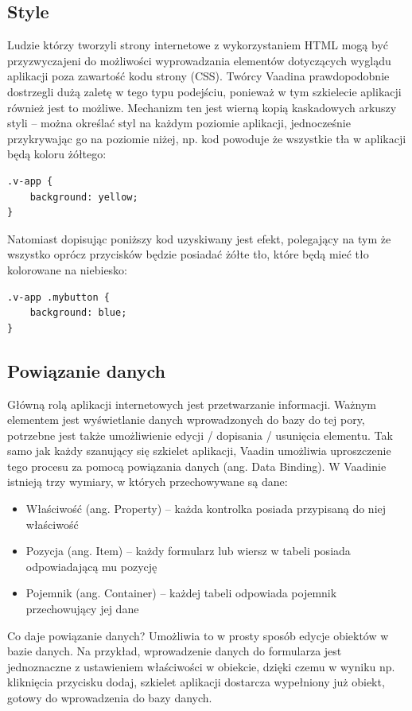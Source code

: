 \subsection{Style}
Ludzie którzy tworzyli strony internetowe z wykorzystaniem HTML mogą być przyzwyczajeni do możliwości wyprowadzania elementów dotyczących wyglądu aplikacji poza zawartość kodu strony (CSS). Twórcy Vaadina prawdopodobnie dostrzegli dużą zaletę w tego typu podejściu, ponieważ w tym szkielecie aplikacji również jest to możliwe. Mechanizm ten jest wierną kopią kaskadowych arkuszy styli – można określać styl na każdym poziomie aplikacji, jednocześnie przykrywając go na poziomie niżej, np. kod powoduje że wszystkie tła w aplikacji będą koloru żółtego:
\newpage
\begin{lstlisting}
.v-app {
	background: yellow;
}
\end{lstlisting}
Natomiast dopisując poniższy kod uzyskiwany jest efekt, polegający na tym że wszystko oprócz przycisków będzie posiadać żółte tło, które będą mieć tło kolorowane na niebiesko:

\begin{lstlisting}
.v-app .mybutton {
	background: blue;
}
\end{lstlisting}
\subsection{Powiązanie danych}
Główną rolą aplikacji internetowych jest przetwarzanie informacji. Ważnym elementem jest wyświetlanie danych wprowadzonych do bazy do tej pory, potrzebne jest także umożliwienie edycji / dopisania / usunięcia elementu. Tak samo jak każdy szanujący się szkielet aplikacji, Vaadin umożliwia uproszczenie tego procesu za pomocą powiązania danych (ang. Data Binding). W Vaadinie istnieją trzy wymiary, w których przechowywane są dane:
\begin{itemize}
\item Właściwość (ang. Property) – każda kontrolka posiada przypisaną do niej właściwość
\item Pozycja (ang. Item) – każdy formularz lub wiersz w tabeli posiada odpowiadającą mu pozycję
\item Pojemnik (ang. Container) – każdej tabeli odpowiada pojemnik przechowujący jej dane
\end{itemize}

Co daje powiązanie danych? Umożliwia to w prosty sposób edycje obiektów w bazie danych. Na przykład, wprowadzenie danych do formularza jest jednoznaczne z ustawieniem właściwości w obiekcie, dzięki czemu w wyniku np. kliknięcia przycisku dodaj, szkielet aplikacji dostarcza wypełniony już obiekt, gotowy do wprowadzenia do bazy danych. 


